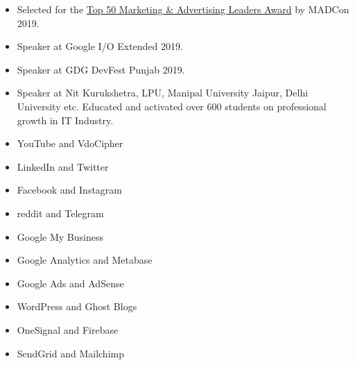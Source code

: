 



\begin{itemize}
    \item  \color{LightGrey} Selected for the \color{blue}\href{https://drive.google.com/drive/folders/1W8HZmATotqPVJcRV8dol9LuKinMlSWxu?usp=sharing }{Top 50 Marketing \& Advertising Leaders Award} \color{LightGrey} by MADCon 2019.
    \item  \color{LightGrey} Speaker at \color{blue}G\color{red}o\color{yellow}o\color{blue}g\color{teal}l\color{red}e \color{LightGrey} I/O Extended 2019. 
    \item  \color{LightGrey} Speaker at \color{LightGrey} GDG DevFest Punjab 2019.
    \item Speaker at Nit Kurukshetra, LPU, Manipal University Jaipur, Delhi University etc. Educated and activated over 600 students on professional growth in IT Industry.  
    \end{itemize}
    

   
   \begin{itemize} 
\item {\color {Mulberry} YouTube and VdoCipher}
\item {\color {Mulberry} LinkedIn and Twitter}
\item {\color {Mulberry} Facebook and Instagram}
\item {\color {Mulberry} reddit and Telegram}
\item {\color {Mulberry} Google My Business}
\item {\color {Mulberry} Google Analytics and Metabase}
\item {\color {Mulberry} Google Ads and AdSense}
\item {\color {Mulberry} WordPress and Ghost Blogs}
\item {\color {Mulberry} OneSignal and Firebase}
\item {\color {Mulberry} SendGrid and Mailchimp}

\end{itemize}


